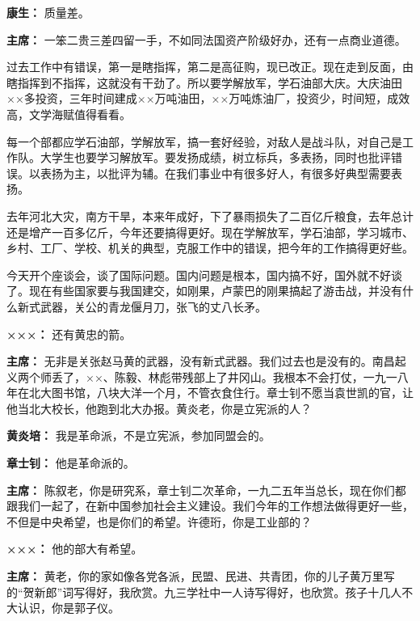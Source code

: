 \begin{duihua}
\item[\textbf{康生：}] 质量差。

\item[\textbf{主席：}] 一笨二贵三差四留一手，不如同法国资产阶级好办，还有一点商业道德。

过去工作中有错误，第一是瞎指挥，第二是高征购，现已改正。现在走到反面，由瞎指挥到不指挥，这就没有干劲了。所以要学解放军，学石油部大庆。大庆油田××多投资，三年时间建成××万吨油田，××万吨炼油厂，投资少，时间短，成效高，文学海赋值得看看。

每一个部都应学石油部，学解放军，搞一套好经验，对敌人是战斗队，对自己是工作队。大学生也要学习解放军。要发扬成绩，树立标兵，多表扬，同时也批评错误。以表扬为主，以批评为辅。在我们事业中有很多好人，有很多好典型需要表扬。

去年河北大灾，南方干旱，本来年成好，下了暴雨损失了二百亿斤粮食，去年总计还是增产一百多亿斤，今年还要搞得更好。现在学解放军，学石油部，学习城市、乡村、工厂、学校、机关的典型，克服工作中的错误，把今年的工作搞得更好些。

今天开个座谈会，谈了国际问题。国内问题是根本，国内搞不好，国外就不好谈了。现在有些国家要与我国建交，如刚果，卢蒙巴的刚果搞起了游击战，并没有什么新式武器，关公的青龙偃月刀，张飞的丈八长矛。

\item[\textbf{×××：}] 还有黄忠的箭。

\item[\textbf{主席：}] 无非是关张赵马黄的武器，没有新式武器。我们过去也是没有的。南昌起义两个师丢了，××、陈毅、林彪带残部上了井冈山。我根本不会打仗，一九一八年在北大图书馆，八块大洋一个月，不管衣食住行。章士钊不愿当袁世凯的官，让他当北大校长，他跑到北大办报。黄炎老，你是立宪派的人？

\item[\textbf{黄炎培：}] 我是革命派，不是立宪派，参加同盟会的。

\item[\textbf{章士钊：}] 他是革命派的。

\item[\textbf{主席：}] 陈叙老，你是研究系，章士钊二次革命，一九二五年当总长，现在你们都跟我们一起了，在新中国参加社会主义建设。我们今年的工作想法做得更好一些，不但是中央希望，也是你们的希望。许德珩，你是工业部的？

\item[\textbf{×××：}] 他的部大有希望。

\item[\textbf{主席：}] 黄老，你的家如像各党各派，民盟、民进、共青团，你的儿子黄万里写的“贺新郎”词写得好，我欣赏。九三学社中一人诗写得好，也欣赏。孩子十几人不大认识，你是郭子仪。


\end{duihua}
